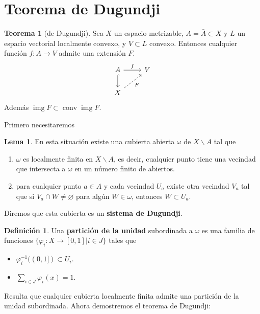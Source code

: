 \documentclass[spanish]{article}
\theoremstyle{definition}
\newtheorem*{defn}{Definición}
\newtheorem*{lema}{Lema}
\newtheorem*{teo}{Teorema}
\DeclareMathOperator{\img}{img}
\DeclareMathOperator{\conv}{conv}
\begin{document}
\section{Teorema de Dugundji}
\begin{teo}[de Dugundji]
	Sea $X$ un espacio metrizable, $A=\bar{A}\subset X$ y $L$ un espacio vectorial localmente convexo, y $V\subset L$ convexo. Entonces cualquier función $f:A\to V$ admite una extensión $F$.
\[\begin{tikzcd}
	A\arrow[r,"f"]\arrow[hook,d]&V\\
	X\arrow[ur,dashed,"F",swap]
\end{tikzcd}\]
Además $\img F\subset\conv\img F$.
\end{teo}
Primero necesitaremos
\begin{lema}
	En esta situación existe una cubierta abierta $\omega$ de $X\backslash A$ tal que
	\begin{enumerate}
		\item $\omega$ es localmente finita en $X\backslash A$, es decir, cualquier punto tiene una vecindad que intersecta a $\omega$ en un número finito de abiertos.
		\item para cualquier punto $a\in A$ y cada vecindad $U_a$ existe otra vecindad $V_a$ tal que si $V_a\cap W\neq\varnothing$ para algún $W\in\omega$, entonces $W\subset U_a$.
	\end{enumerate}
	Diremos que esta cubierta es un \textbf{sistema de Dugundji}.
\end{lema}
\begin{defn}
	Una \textbf{partición de la unidad} subordinada a $\omega$ es una familia de funciones $\{\varphi_i:X\to[0,1]| i\in J\}$ tales que
	\begin{itemize}
		\item $\varphi_i^{-1}((0,1])\subset U_i$.
		\item $\sum_{i\in J}\varphi_i(x)=1$.
	\end{itemize}
\end{defn}
Resulta que cualquier cubierta localmente finita admite una partición de la unidad subordinada. Ahora demostremos el teorema de Dugundji:
\end{document}
